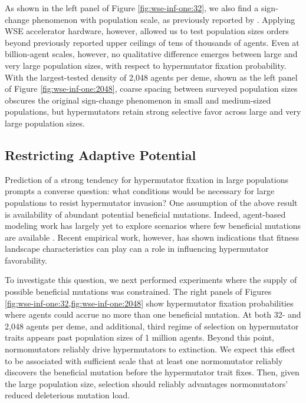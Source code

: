 As shown in the left panel of Figure \ref{fig:wse-inf-one:32}, we also find a sign-change phenomenon with population scale, as previously reported by \citet{raynes2018sign}.
Applying WSE accelerator hardware, however, allowed us to test population sizes orders beyond previously reported upper ceilings of tens of thousands of agents.
Even at billion-agent scales, however, no qualitative difference emerges between large and very large population sizes, with respect to hypermutator fixation probability.
With the largest-tested density of 2,048 agents per deme, shown as the left panel of Figure \ref{fig:wse-inf-one:2048}, coarse spacing between surveyed population sizes obscures the original sign-change phenomenon in small and medium-sized populations, but hypermutators retain strong selective favor across large and very large population sizes.

\subsection{Restricting Adaptive Potential}
\label{sec:restricting-adaptive-potential}

Prediction of a strong tendency for hypermutator fixation in large populations prompts a converse question: what conditions would be necessary for large populations to resist hypermutator invasion?
One assumption of the above result is availability of abundant potential beneficial mutations.
Indeed, agent-based modeling work has largely yet to explore scenarios where few beneficial mutations are available \citep{raynes2013effect,raynes2018sign,raynes2019selection,raynes2019migration}.
Recent empirical work, however, has shown indications that fitness landscape characteristics can play can a role in influencing hypermutator favorability.

To investigate this question, we next performed experiments where the supply of possible beneficial mutations was constrained.
The right panels of Figures \cref{fig:wse-inf-one:32,fig:wse-inf-one:2048} show hypermutator fixation probabilities where agents could accrue no more than one beneficial mutation.
At both 32- and 2,048 agents per deme, and additional, third regime of selection on hypermutator traits appears past population sizes of 1 million agents.
Beyond this point, normomutators reliably drive hypermutators to extinction.
We expect this effect to be associated with sufficient scale that at least one normomutator reliably discovers the beneficial mutation before the hypermutator trait fixes.
Then, given the large population size, selection should reliably advantages normomutators' reduced deleterious mutation load.

